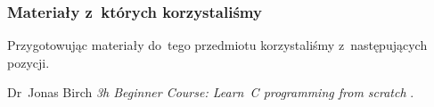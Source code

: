 \documentclass[10pt,t]{beamer}
\begin{document}
\begin{frame}
  \frametitle{Materiały z~których korzystaliśmy}


  Przygotowując materiały do~tego przedmiotu korzystaliśmy z~następujących
  pozycji.

  Dr~Jonas Birch \textit{3h Beginner Course: Learn~C programming from
    scratch}
  \parencite{Birch-3h-Beginner-Course-Learn-C-programming-ETC-Ver-2025}.

\end{frame}











\printbibliography





\end{document}
